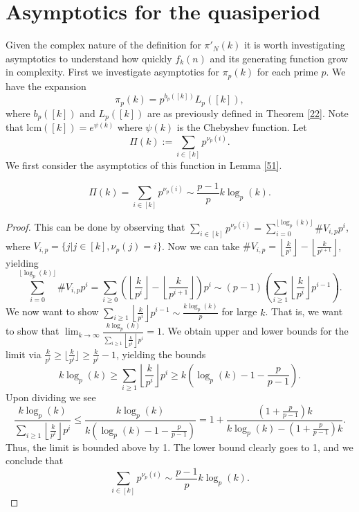 \documentclass[12pt]{article}
\newcommand{\bra}[1]{{\left({#1}\right)}}
\newcommand{\eqdef}{:=}
\begin{document}
\section{Asymptotics for the quasiperiod}
Given the complex nature of the definition for $\pi'_N(k)$ it is worth investigating asymptotics to understand how quickly $f_{k}(n)$ and its generating function grow in complexity. First we investigate asymptotics for $\pi_p(k)$ for each prime $p$. We have the expansion
\[\pi_p(k) = p^{b_p([k])} L_p([k]),\]
where $b_p([k])$ and $L_p([k])$ are as previously defined in Theorem \ref{22}. Note that $\text{lcm}([k]) = e^{\psi(k)}$ where $\psi(k)$ is the Chebyshev function. Let \[\Pi(k) \eqdef \sum_{i\in[k]}{p^{\nu_p(i)}}.\]
We first consider the asymptotics of this function in Lemma \ref{51}.

\begin{lemma}\[\Pi(k) = \sum_{i\in[k]}{p^{\nu_p(i)}} \sim \frac{p-1}{p}k\log_p(k).\]
\label{51}
\end{lemma}
\begin{proof}
This can be done by observing that $\sum_{i\in[k]}{p^{\nu_p(i)}} = \sum_{i=0}^{\lfloor \log_p(k) \rfloor}{\#V_{i,p} p^i}$, where $V_{i,p} = \{ j | j\in[k],  \nu_p(j) = i\}$. Now we can take $\#V_{i,p} = \left\lfloor \frac{k}{p^i}\right\rfloor - \left\lfloor \frac{k}{p^{i+1}} \right\rfloor$, yielding
\[\sum_{i=0}^{\lfloor \log_p(k) \rfloor}{\#V_{i,p} p^i} = \sum_{i\ge 0}{ \left( \left\lfloor \frac{k}{p^i}\right\rfloor - \left\lfloor \frac{k}{p^{i+1}} \right\rfloor \right)p^i} \sim  (p-1) \left(\sum_{i\ge 1}{\left\lfloor \frac{k}{p^i} \right\rfloor p^{i-1}}\right).\]
We now want to show $\sum_{i\ge 1}{\left\lfloor \frac{k}{p^i} \right\rfloor p^{i-1}} \sim \frac{k\log_p(k)}{p}$ for large $k$. That is, we want to show that $\lim_{k \to \infty}{\frac{k\log_p(k)}{\sum_{i\ge 1}{\left\lfloor \frac{k}{p^i} \right\rfloor p^{i}}}} = 1$. We obtain upper and lower bounds for the limit via $\frac{k}{p^i}\ge \lfloor \frac{k}{p^i} \rfloor \ge \frac{k}{p^i}-1$, yielding the bounds
\[k\log_p(k) \ge \sum_{i\ge 1}{\left\lfloor \frac{k}{p^i} \right\rfloor p^{i}} \ge k\bra{\log_p(k)-1-\frac{p}{p-1}}. \]
Upon dividing we see
\[\frac{k\log_p(k)}{\sum_{i\ge 1}{\left\lfloor \frac{k}{p^i} \right\rfloor p^{i}}} \le \frac{k\log_p(k)}{k(\log_p(k)-1-\frac{p}{p-1})} = 1+\frac{(1+\frac{p}{p-1})k}{k\log_p(k)-(1+\frac{p}{p-1})k}.\]
Thus, the limit is bounded above by 1. The lower bound clearly goes to 1, and we conclude that
\[\sum_{i\in[k]}{p^{\nu_p(i)}} \sim \frac{p-1}{p}k\log_p(k).\] 
\end{proof}
\end{document}
